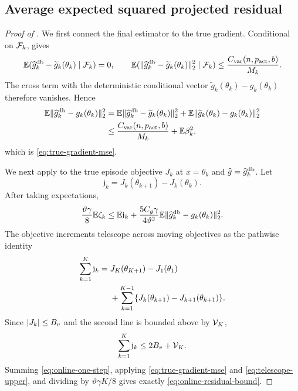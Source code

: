 \subsection{Average expected squared projected residual}

\begin{proof}[Proof of ]
We first connect the final estimator to the true gradient.  Conditional on $\mathcal F_k$,  gives
\[
 \mathbb E(\widehat g_k^{\mathrm{db}}-\widetilde g_k(\theta_k)\mid\mathcal F_k)=0,
 \qquad
 \mathbb E(\lVert\widehat g_k^{\mathrm{db}}-\widetilde g_k(\theta_k)\rVert_2^2\mid\mathcal F_k)
 \le\frac{C_{\rm var}(n,p_{\rm act},b)}{M_k}.
\]
The cross term with the deterministic conditional vector
$\widetilde g_k(\theta_k)-g_k(\theta_k)$ therefore vanishes.  Hence
\begin{align*}
 \mathbb E\lVert\widehat g_k^{\mathrm{db}}-g_k(\theta_k)\rVert_2^2
 &=\mathbb E\lVert\widehat g_k^{\mathrm{db}}-\widetilde g_k(\theta_k)\rVert_2^2
 +\mathbb E\lVert\widetilde g_k(\theta_k)-g_k(\theta_k)\rVert_2^2\\
 &\le\frac{C_{\rm var}(n,p_{\rm act},b)}{M_k}+\mathbb E\beta_k^2,
\end{align*}
which is \eqref{eq:true-gradient-mse}.

We next apply  to the true episode objective $J_k$ at $x=\theta_k$ and $\widehat g=\widehat g_k^{\mathrm{db}}$.  Let
\[
 \mathfrak j_k=J_k(\theta_{k+1})-J_k(\theta_k).
\]
After taking expectations,
\begin{equation}\label{eq:online-one-step}
 \frac{\vartheta\gamma}{8}\mathbb E\zeta_k
 \le\mathbb E \mathfrak j_k
 +\frac{5C_g\gamma}{4\vartheta^2}
 \mathbb E\lVert\widehat g_k^{\mathrm{db}}-g_k(\theta_k)\rVert_2^2.
\end{equation}
The objective increments telescope across moving objectives as the pathwise identity
\begin{align}\label{eq:moving-objective-telescope}
 \sum_{k=1}^{K}\mathfrak j_k
 ={}&J_K(\theta_{K+1})-J_1(\theta_1)\notag\\
 &+\sum_{k=1}^{K-1}
 \{J_k(\theta_{k+1})-J_{k+1}(\theta_{k+1})\}.
\end{align}
Since $\lvert J_k\rvert\le B_v$ and the second line is bounded above by $\mathcal V_K$,
\begin{equation}\label{eq:telescope-upper}
 \sum_{k=1}^{K}\mathfrak j_k\le2B_v+\mathcal V_K.
\end{equation}
Summing \eqref{eq:online-one-step}, applying \eqref{eq:true-gradient-mse} and \eqref{eq:telescope-upper}, and dividing by $\vartheta\gamma K/8$ gives exactly \eqref{eq:online-residual-bound}.
\end{proof}

